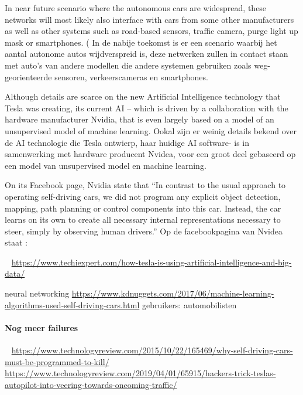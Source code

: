 \documentclass{article}
\begin{document}
In near future scenario where the autonomous cars are widespread, these networks will most likely also interface with cars from some other manufacturers as well as other systems such as road-based sensors, traffic camera, purge light up mask or smartphones. ( In de nabije toekomst is er een scenario  waarbij  het aantal autonome autos wijdverspreid is, deze netwerken zullen in contact staan met auto's van andere modellen die andere systemen gebruiken zoals weg-georienteerde sensoren, verkeerscameras en smartphones.

Although details are scarce on the new Artificial Intelligence technology that Tesla was creating, its current AI – which is driven by a collaboration with the hardware manufacturer Nvidia, that is even largely based on a model of an unsupervised model of machine learning. Ookal zijn er weinig details bekend over de AI technologie die Tesla ontwierp, haar huidige AI software- is in samenwerking met hardware producent Nvidea, voor een groot deel gebaseerd op een model van unsupervised model en machine learning.

On its Facebook page, Nvidia state that “In contrast to the usual approach to operating self-driving cars, we did not program any explicit object detection, mapping, path planning or control components into this car. Instead, the car learns on its own to create all necessary internal representations necessary to steer, simply by observing human drivers.” Op de facebookpagina van Nvidea staat :

~\cite{techiebigdata}
\url{https://www.techiexpert.com/how-tesla-is-using-artificial-intelligence-and-big-data/}



neural networking
\url{https://www.kdnuggets.com/2017/06/machine-learning-algorithms-used-self-driving-cars.html}
gebruikers: automobilisten



\paragraph{Nog meer failures}
~\cite{drivingtokill}
\url{https://www.technologyreview.com/2015/10/22/165469/why-self-driving-cars-must-be-programmed-to-kill/}
~\cite{hackerstraffck}
\url{https://www.technologyreview.com/2019/04/01/65915/hackers-trick-teslas-autopilot-into-veering-towards-oncoming-traffic/}
\end{document}
